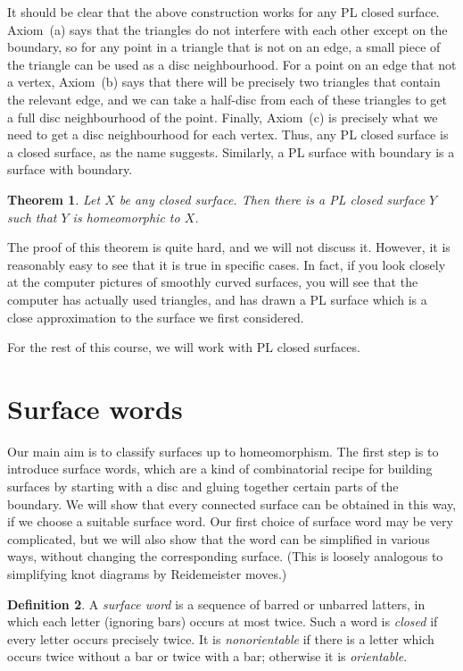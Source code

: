 \documentclass[reqno]{amsart}
\newtheorem{theorem}{Theorem}[section]
\theoremstyle{definition}
\newtheorem{definition}[theorem]{Definition}
\begin{document}
It should be clear that the above construction works for any PL closed
surface.  Axiom~(a) says that the triangles do not interfere with each
other except on the boundary, so for any point in a triangle that is
not on an edge, a small piece of the triangle can be used as a disc
neighbourhood.  For a point on an edge that not a vertex, Axiom~(b)
says that there will be precisely two triangles that contain the
relevant edge, and we can take a half-disc from each of these
triangles to get a full disc neighbourhood of the point.  Finally,
Axiom~(c) is precisely what we need to get a disc neighbourhood  for
each vertex.  Thus, any PL closed surface is a closed surface, as the
name suggests.  Similarly, a PL surface with boundary is a surface
with boundary.

\begin{theorem}
 Let $X$ be any closed surface.  Then there is a PL closed surface $Y$
 such that $Y$ is homeomorphic to $X$.
\end{theorem}

The proof of this theorem is quite hard, and we will not discuss it.
However, it is reasonably easy to see that it is true in specific
cases.  In fact, if you look closely at the computer pictures of
smoothly curved surfaces, you will see that the computer has actually
used triangles, and has drawn a PL surface which is a close
approximation to the surface we first considered.

For the rest of this course, we will work with PL closed surfaces.

\section{Surface words}
\label{sec-surf-words}

Our main aim is to classify surfaces up to homeomorphism.  The first
step is to introduce surface words, which are a kind of combinatorial
recipe for building surfaces by starting with a disc and gluing
together certain parts of the boundary.  We will show that every
connected surface can be obtained in this way, if we choose a suitable
surface word.  Our first choice of surface word may be very
complicated, but we will also show that the word can be simplified in
various ways, without changing the corresponding surface.  (This is
loosely analogous to simplifying knot diagrams by Reidemeister moves.) 

\begin{definition}\label{defn-word}
 A \emph{surface word} is a sequence of barred or unbarred latters, in
 which each letter (ignoring bars) occurs at most twice.  Such a word
 is \emph{closed} if every letter occurs precisely twice.  It is
 \emph{nonorientable} if there is a letter which occurs twice without
 a bar or twice with a bar; otherwise it is \emph{orientable}.
\end{definition}
\end{document}
